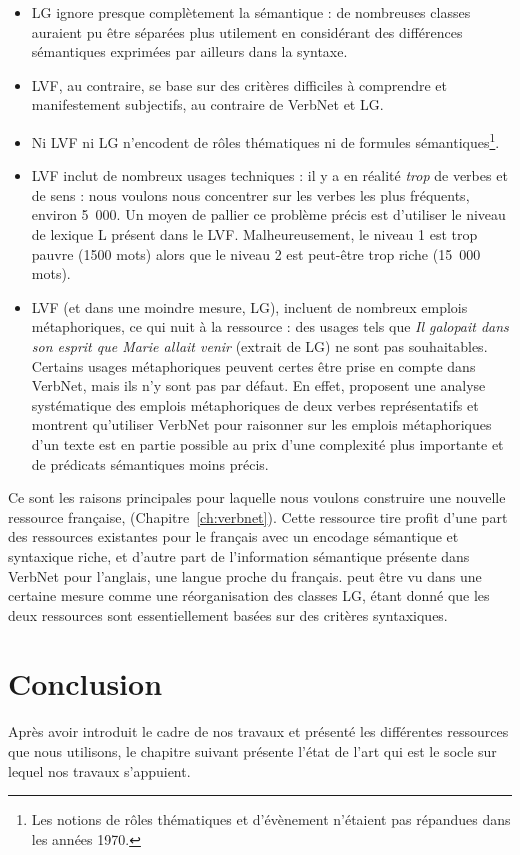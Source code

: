 \begin{itemize}
    \item LG ignore presque complètement la sémantique : de nombreuses classes
        auraient pu être séparées plus utilement en considérant des différences
        sémantiques exprimées par ailleurs dans la syntaxe.
    \item LVF, au contraire, se base sur des critères difficiles à comprendre et
        manifestement subjectifs, au contraire de VerbNet et LG.
    \item Ni LVF ni LG n'encodent de rôles thématiques ni de formules
        sémantiques\footnote{Les notions de rôles thématiques et d'évènement
        n'étaient pas répandues dans les années 1970.}.
    \item LVF inclut de nombreux usages techniques : il y a en réalité
        \textit{trop} de verbes et de sens : nous voulons nous concentrer sur les
        verbes les plus fréquents, environ 5~000. Un moyen de pallier ce
        problème précis est d'utiliser le niveau de lexique L présent dans le
        LVF. Malheureusement, le niveau 1 est trop pauvre (1500 mots) alors que
        le niveau 2 est peut-être trop riche (15~000 mots).
    \item LVF (et dans une moindre mesure, LG), incluent de nombreux emplois
        métaphoriques, ce qui nuit à la ressource : des usages tels que
        \textit{Il galopait dans son esprit que Marie allait venir} (extrait de
        LG) ne sont pas souhaitables. Certains usages métaphoriques peuvent
        certes être prise en compte dans VerbNet, mais ils n'y sont pas par
        défaut. En effet, \cite{brown2012semantic} proposent une analyse
        systématique des emplois métaphoriques de deux verbes représentatifs et
        montrent qu'utiliser VerbNet pour raisonner sur les emplois
        métaphoriques d'un texte est en partie possible au prix d'une complexité
        plus importante et de prédicats sémantiques moins précis.
\end{itemize}

Ce sont les raisons principales pour laquelle nous voulons construire une
nouvelle ressource française, \verbenet{} (Chapitre~\ref{ch:verbnet}). Cette
ressource tire profit d'une part des ressources existantes pour le français
avec un encodage sémantique et syntaxique riche, et d'autre part de
l'information sémantique présente dans VerbNet pour l'anglais, une langue
proche du français. \verbenet{} peut être vu dans une certaine mesure comme une
réorganisation des classes LG, étant donné que les deux ressources sont
essentiellement basées sur des critères syntaxiques.

\section*{Conclusion}

Après avoir introduit le cadre de nos travaux et présenté les différentes
ressources que nous utilisons, le chapitre suivant présente l'état de l'art qui
est le socle sur lequel nos travaux s'appuient.
